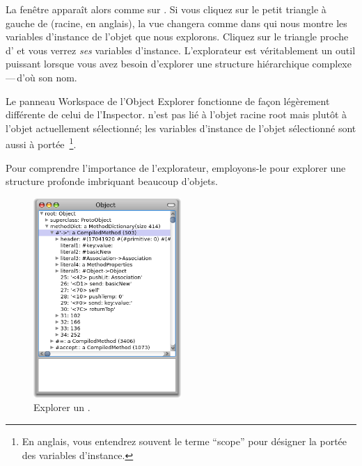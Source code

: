 \documentclass[a4paper,10pt,twoside]{book}
\begin{document}
La fenêtre  apparaît alors comme sur
 .
Si vous cliquez sur le petit triangle à gauche de  (racine, en anglais), la vue changera comme dans  qui
nous montre les variables d'instance de l'objet que nous explorons.
Cliquez sur le triangle proche d' et vous verrez
\emph{ses} variables d'instance.
L'explorateur est véritablement un outil puissant lorsque vous avez besoin
d'explorer une structure hiérarchique complexe\,---\,d'où son nom.

Le panneau Workspace de l'Object Explorer fonctionne de façon
 légèrement différente de celui de l'Inspector.
 n'est pas lié à l'objet racine root mais plutôt
à l'objet actuellement sélectionné; les variables d'instance de
l'objet sélectionné sont aussi à portée~\footnote{En anglais, vous
entendrez souvent le terme ``scope'' pour désigner la portée des
variables d'instance.}.

Pour comprendre l'importance de l'explorateur, employons-le pour
explorer une structure profonde imbriquant beaucoup d'objets.


\begin{figure}[tbp]
	\begin{center}
		\includegraphics[width=0.5\textwidth]{ExploreObject}
	\end{center}
	\caption{Explorer un .}
\end{figure}
\end{document}
